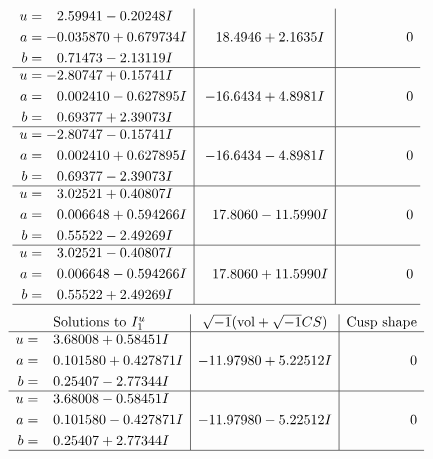 \documentclass[1p]{elsarticle_modified}
\theoremstyle{definition}
\newcommand{\I}{\sqrt{-1}}
\begin{document}
$$\begin{array}{c|c|c}
\begin{aligned}
u &= \phantom{-}2.59941 - 0.20248 I \\
a &= -0.035870 + 0.679734 I \\
b &= \phantom{-}0.71473 - 2.13119 I\end{aligned}
 & \phantom{-}18.4946 + 2.1635 I & \phantom{-0.000000 } 0 \\ \hline\begin{aligned}
u &= -2.80747 + 0.15741 I \\
a &= \phantom{-}0.002410 - 0.627895 I \\
b &= \phantom{-}0.69377 + 2.39073 I\end{aligned}
 & -16.6434 + 4.8981 I & \phantom{-0.000000 } 0 \\ \hline\begin{aligned}
u &= -2.80747 - 0.15741 I \\
a &= \phantom{-}0.002410 + 0.627895 I \\
b &= \phantom{-}0.69377 - 2.39073 I\end{aligned}
 & -16.6434 - 4.8981 I & \phantom{-0.000000 } 0 \\ \hline\begin{aligned}
u &= \phantom{-}3.02521 + 0.40807 I \\
a &= \phantom{-}0.006648 + 0.594266 I \\
b &= \phantom{-}0.55522 - 2.49269 I\end{aligned}
 & \phantom{-}17.8060 - 11.5990 I & \phantom{-0.000000 } 0 \\ \hline\begin{aligned}
u &= \phantom{-}3.02521 - 0.40807 I \\
a &= \phantom{-}0.006648 - 0.594266 I \\
b &= \phantom{-}0.55522 + 2.49269 I\end{aligned}
 & \phantom{-}17.8060 + 11.5990 I & \phantom{-0.000000 } 0\\
 \hline 
 \end{array}$$\newpage$$\begin{array}{c|c|c}  
\text{Solutions to }I^u_{1}& \I (\text{vol} + \sqrt{-1}CS) & \text{Cusp shape}\\
 \hline 
\begin{aligned}
u &= \phantom{-}3.68008 + 0.58451 I \\
a &= \phantom{-}0.101580 + 0.427871 I \\
b &= \phantom{-}0.25407 - 2.77344 I\end{aligned}
 & -11.97980 + 5.22512 I & \phantom{-0.000000 } 0 \\ \hline\begin{aligned}
u &= \phantom{-}3.68008 - 0.58451 I \\
a &= \phantom{-}0.101580 - 0.427871 I \\
b &= \phantom{-}0.25407 + 2.77344 I\end{aligned}
 & -11.97980 - 5.22512 I & \phantom{-0.000000 } 0\\
 \hline 
 \end{array}$$\newpage\newpage\renewcommand{\arraystretch}{1}
\end{document}
